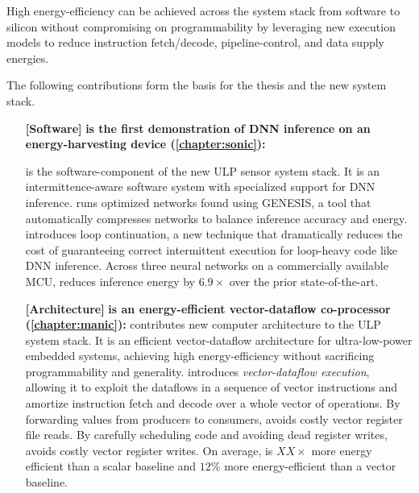 \begin{adjustwidth}{1cm}{1cm}
High energy-efficiency can be achieved 
across the system stack from software to silicon without compromising on programmability by leveraging new execution models to reduce instruction fetch/decode, pipeline-control, and data supply energies.
% 

\end{adjustwidth}
% 
The following contributions form the basis for the thesis and the new system stack.

\begin{itemize}

\item[\textbf{[Software]}]
\textbf{\sonic is the first demonstration of DNN inference on an energy-harvesting device (\autoref{chapter:sonic}): }

\sonic is the software-component of the new ULP sensor system stack.
% 
It is an intermittence-aware software system with specialized support for DNN inference. 
% 
\sonic runs optimized networks found using GENESIS, a tool that automatically compresses networks to balance inference accuracy and energy.
% 
\sonic introduces loop continuation, a new technique that dramatically reduces the cost of guaranteeing correct intermittent execution for loop-heavy code like DNN inference. 
% 
Across three neural networks on a commercially available MCU, \sonic reduces inference energy by $6.9\times$ over the prior state-of-the-art.

\item[\textbf{[Architecture]}]
\textbf{\manic is an energy-efficient vector-dataflow co-processor (\autoref{chapter:manic}): }
\manic contributes new computer architecture to the ULP system stack.
% 
It is an efficient vector-dataflow architecture for ultra-low-power embedded systems, achieving high energy-efficiency without sacrificing programmability and generality.
% 
\manic introduces \emph{vector-dataflow execution}, allowing it to exploit the
dataflows in a sequence of vector instructions and amortize instruction
fetch and decode over a whole vector of operations.
%
By forwarding values from producers to consumers, \manic avoids costly vector register file reads.
% 
By carefully scheduling code and avoiding dead register writes, \manic avoids costly vector register writes.
% 
On average, \manic is $XX\times$  more energy efficient than a scalar baseline and $12\%$ more energy-efficient than a vector baseline.


\end{itemize}

